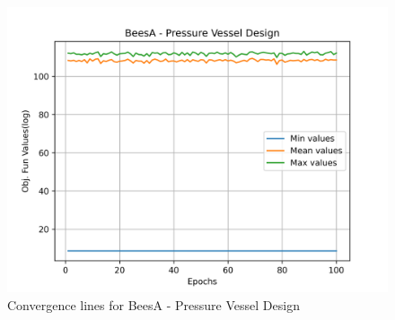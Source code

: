\begin{figure}[H]
        \centering
        \caption{Convergence lines for BeesA - Pressure Vessel Design}
        \label{fig:pressure_vessel_problem_solve_beesa}
        \includegraphics[scale=0.5]{images/pressure_vessel_problem_solve_beesa.png}
        \end{figure}
        